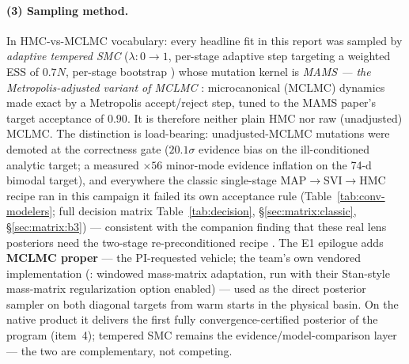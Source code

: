 \paragraph{(3) Sampling method.}
In HMC-vs-MCLMC vocabulary: every headline fit in this report was sampled
by \emph{adaptive tempered SMC} \citep{delmoral2006smc} ($\lambda:0\to1$,
per-stage adaptive step targeting a weighted ESS of $0.7N$, per-stage
bootstrap \logZ) whose mutation kernel is \emph{MAMS --- the
Metropolis-adjusted variant of MCLMC}
\citep{robnik2023mclmc,robnik2024mams}: microcanonical (MCLMC) dynamics
made exact by a Metropolis accept/reject step, tuned to the MAMS paper's
target acceptance of $0.90$. It is therefore neither plain HMC nor raw
(unadjusted) MCLMC. The distinction is load-bearing: unadjusted-MCLMC
mutations were demoted at the correctness gate ($20.1\sigma$ evidence bias
on the ill-conditioned analytic target; a measured $\times56$ minor-mode
evidence inflation on the 74-d bimodal target), and everywhere the classic
single-stage MAP$\to$SVI$\to$HMC recipe ran in this campaign it failed its
own acceptance rule (Table~\ref{tab:conv-modelers}; full decision matrix
Table~\ref{tab:decision}, \S\ref{sec:matrix:classic},
\S\ref{sec:matrix:b3}) --- consistent with the companion finding that
these real lens posteriors need the two-stage re-preconditioned recipe
\citep{cgl2026companion}. The E1 epilogue adds \textbf{MCLMC proper} ---
the PI-requested vehicle; the team's own vendored implementation
(: windowed mass-matrix
adaptation, run with their Stan-style mass-matrix regularization option
enabled) --- used as the direct posterior sampler on both diagonal targets
from warm starts in the physical basin. On the native product it delivers
the first fully convergence-certified posterior of the program (item~4);
tempered SMC remains the evidence/model-comparison layer --- the two are
complementary, not competing.

